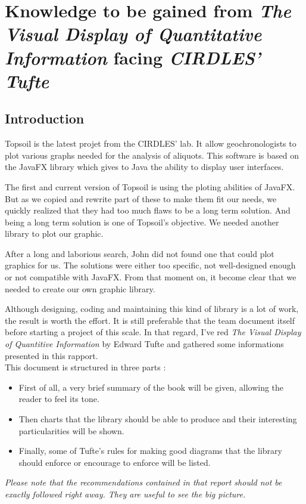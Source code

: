 \chapter{Knowledge to be gained from \textit{The Visual Display of Quantitative Information} facing \textit{CIRDLES' Tufte}}

\section{Introduction}
Topsoil is the latest projet from the CIRDLES' lab. It allow geochronologists to plot various graphs needed for the analysis of aliquots. This software is based on the JavaFX library which gives to Java the ability to display user interfaces.

The first and current version of Topsoil is using the ploting abilities of JavaFX. But as we copied and rewrite part of these to make them fit our needs, we quickly realized that they had too much flaws to be a long term solution.
 And being a long term solution is one of Topsoil's objective. We needed another library to plot our graphic.

After a long and laborious search, John did not found one that could plot graphics for us. The solutions were either too specific, not well-designed enough or not compatible with JavaFX. From that moment on, it become clear that we needed to create our own graphic library. 

Although designing, coding and maintaining this kind of library is a lot of work, the result is worth the effort. It is still preferable that the team document itself before starting a project of this scale. 
In that regard, I've red \textit{The Visual Display of Quantitive Information} by Edward Tufte and gathered some informations presented in this rapport.
\\

This document is structured in three parts : 
\begin{itemize}
\item First of all, a very brief summary of the book will be given, allowing the reader to feel its tone.
\item Then charts that the library should be able to produce and their interesting particularities will be shown.
\item Finally, some of Tufte's rules for making good diagrams that the library should enforce or encourage to enforce will be listed. 
\end{itemize}
\emph{Please note that the recommendations contained in that report should not be exactly followed right away. They are useful to see the big picture.}




